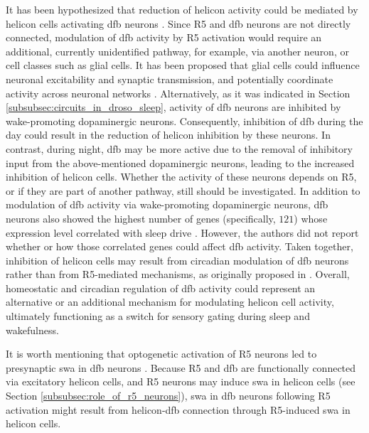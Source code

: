 \documentclass[../main.tex]{subfiles}
\begin{document}
It has been hypothesized that reduction of helicon activity could be mediated by helicon cells activating \gls{dfb} neurons \cite{raccugliaCoherentMultilevelNetwork2022}.
Since R5 and \gls{dfb} neurons are not directly connected, modulation of \gls{dfb} activity by R5 activation would require an additional, currently unidentified pathway, for example, via another neuron, or cell classes such as glial cells.
It has been proposed that glial cells could influence neuronal excitability and synaptic transmission, and potentially coordinate activity across neuronal networks \cite{fieldsNewInsightsNeuronglia2002}.
Alternatively, as it was indicated in Section \ref{subsubsec:circuits_in_droso_sleep}, activity of \gls{dfb} neurons are inhibited by wake-promoting dopaminergic neurons.
Consequently, inhibition of \gls{dfb} during the day could result in the reduction of helicon inhibition by these neurons. In contrast, during night, \gls{dfb} may be more active due to the removal of inhibitory input from the above-mentioned dopaminergic neurons, leading to the increased inhibition of helicon cells.
Whether the activity of these neurons depends on R5, or if they are part of another pathway, still should be investigated. In addition to modulation of \gls{dfb} activity via wake-promoting dopaminergic neurons, \gls{dfb} neurons also showed the highest number of genes (specifically, $121$) whose expression level correlated with sleep drive \cite{doppSinglecellTranscriptomicsReveals2024}. However, the authors did not report whether or how those correlated genes could affect \gls{dfb} activity. 
Taken together, inhibition of helicon cells may result from circadian modulation of \gls{dfb} neurons rather than from R5-mediated mechanisms, as originally proposed in \cite{raccugliaCoherentMultilevelNetwork2022}. Overall, homeostatic and circadian regulation of \gls{dfb} activity could represent an alternative or an additional mechanism for modulating helicon cell activity, ultimately functioning as a switch for sensory gating during sleep and wakefulness.

It is worth mentioning that optogenetic activation of R5 neurons led to presynaptic \gls{swa} in \gls{dfb} neurons \cite{raccugliaCoherentMultilevelNetwork2022}.
Because R5 and \gls{dfb} are functionally connected via excitatory helicon cells, and R5 neurons may induce \gls{swa} in helicon cells (see Section \ref{subsubsec:role_of_r5_neurons}), \gls{swa} in \gls{dfb} neurons following R5 activation might result from helicon-\gls{dfb} connection through R5-induced \gls{swa} in helicon cells.
\end{document}
